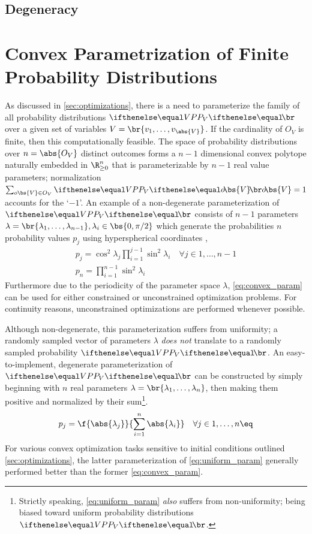 \documentclass[aps, 10pt, english, twoside, pra, nofootinbib, longbibliography]{revtex4-1}
\theoremstyle{plain}
\theoremstyle{definition}
\theoremstyle{remark}
\newcommand{\outc}[1]{o\!\bs{#1}}
\begin{document}
    \subsection{Degeneracy}
    \section{Convex Parametrization of Finite Probability Distributions}
    As discussed in \cref{sec:optimizations}, there is a need to parameterize the family of all probability distributions $\prob[V]$ over a given set of variables $V = \br{v_1, \ldots, v_{\abs{V}}}$. If the cardinality of $O_{V}$ is finite, then this computationally feasible. The space of probability distributions over $n = \abs{O_{V}}$ distinct outcomes forms a $n-1$ dimensional convex polytope naturally embedded in $\R_{\geq 0}^n$ \cite{Brunner_2013} that is parameterizable by $n-1$ real value parameters; normalization $\sum_{o\bs{V} \in O_V} \prob[V][\outc{V}] = 1$ accounts for the `$-1$'. An example of a non-degenerate parameterization of $\prob[V]$ consists of $n-1$ parameters $\lambda = \br{\lambda_1, \ldots, \lambda_{n-1}}, \lambda_i \in \bs{0, \pi/2}$ which generate the probabilities $n$ probability values $p_j$ using hyperspherical coordinates \cite{Hedemann_2013, Spengler_2010_Unitary},
    \begin{equation}
    \begin{gathered}
        \label{eq:convex_param}
        p_j = \cos^2 \lambda_j \prod_{i=1}^{j-1} \sin^2 \lambda_i \quad \forall j \in 1, \ldots, n - 1 \\
        p_n = \prod_{i=1}^{n-1} \sin^2 \lambda_i
    \end{gathered}
    \end{equation}
    Furthermore due to the periodicity of the parameter space $\lambda$, \cref{eq:convex_param} can be used for either constrained or unconstrained optimization problems. For continuity reasons, unconstrained optimizations are performed whenever possible.

    Although non-degenerate, this parameterization suffers from uniformity; a randomly sampled vector of parameters $\lambda$ \textit{does not} translate to a randomly sampled probability $\prob[V]$. An easy-to-implement, degenerate parameterization of $\prob[V]$ can be constructed by simply beginning with $n$ real parameters $\lambda = \br{\lambda_1, \ldots, \lambda_n}$, then making them positive and normalized by their sum\footnote{Strictly speaking, \cref{eq:uniform_param} \textit{also} suffers from non-uniformity; being biased toward uniform probability distributions $\prob[V]$. }.
    \[ p_j = \f{\abs{\lambda_j}}{\sum_{i=1}^{n} \abs{\lambda_i}} \quad \forall j \in 1, \ldots, n \eq \label{eq:uniform_param} \]
    For various convex optimization tasks sensitive to initial conditions outlined \cref{sec:optimizations}, the latter parameterization of \cref{eq:uniform_param} generally performed better than the former \cref{eq:convex_param}.

    
\end{document}
